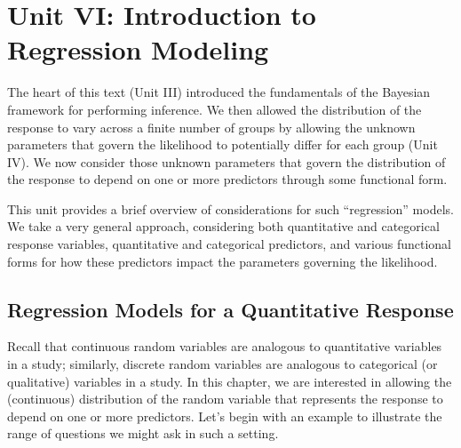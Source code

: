 \documentclass[
  letterpaper,
  DIV=11,
  numbers=noendperiod]{scrreprt}
\theoremstyle{definition}
\theoremstyle{plain}
\theoremstyle{definition}
\theoremstyle{remark}
\begin{document}
\part{Unit VI: Introduction to Regression Modeling}

The heart of this text (Unit III) introduced the fundamentals of the
Bayesian framework for performing inference. We then allowed the
distribution of the response to vary across a finite number of groups by
allowing the unknown parameters that govern the likelihood to
potentially differ for each group (Unit IV). We now consider those
unknown parameters that govern the distribution of the response to
depend on one or more predictors through some functional form.

This unit provides a brief overview of considerations for such
``regression'' models. We take a very general approach, considering both
quantitative and categorical response variables, quantitative and
categorical predictors, and various functional forms for how these
predictors impact the parameters governing the likelihood.

\hypertarget{sec-linear-regression}{%
\chapter{Regression Models for a Quantitative
Response}\label{sec-linear-regression}}

\providecommand{\norm}[1]{\lVert#1\rVert}
\providecommand{\abs}[1]{\lvert#1\rvert}
\providecommand{\iid}{\stackrel{\text{IID}}{\sim}}
\providecommand{\ind}{\stackrel{\text{Ind}}{\sim}}

\providecommand{\bm}[1]{\mathbf{#1}}
\providecommand{\bs}[1]{\boldsymbol{#1}}
\providecommand{\bbeta}{\bs{\beta}}

\providecommand{\Ell}{\mathcal{L}}
\providecommand{\indep}{\perp\negthickspace\negmedspace\perp}

Recall that continuous random variables are analogous to quantitative
variables in a study; similarly, discrete random variables are analogous
to categorical (or qualitative) variables in a study. In this chapter,
we are interested in allowing the (continuous) distribution of the
random variable that represents the response to depend on one or more
predictors. Let's begin with an example to illustrate the range of
questions we might ask in such a setting.
\end{document}

